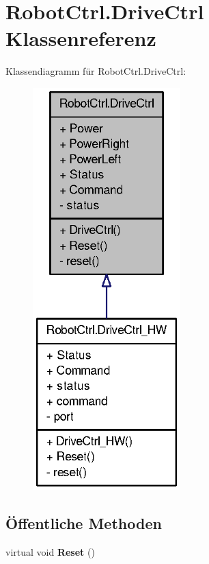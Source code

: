 \hypertarget{class_robot_ctrl_1_1_drive_ctrl}{
\section{RobotCtrl.DriveCtrl Klassenreferenz}
\label{class_robot_ctrl_1_1_drive_ctrl}
}


Klassendiagramm für RobotCtrl.DriveCtrl:\nopagebreak
\begin{figure}[H]
\begin{center}
\leavevmode
\includegraphics[width=162pt]{class_robot_ctrl_1_1_drive_ctrl__inherit__graph}
\end{center}
\end{figure}
\subsection*{Öffentliche Methoden}
\begin{DoxyCompactItemize}
\item 
\hypertarget{class_robot_ctrl_1_1_drive_ctrl_a721795047bfe5d2cca3fab6eeb0ab905}{
virtual void {\bfseries Reset} ()}
\label{class_robot_ctrl_1_1_drive_ctrl_a721795047bfe5d2cca3fab6eeb0ab905}

\end{DoxyCompactItemize}
